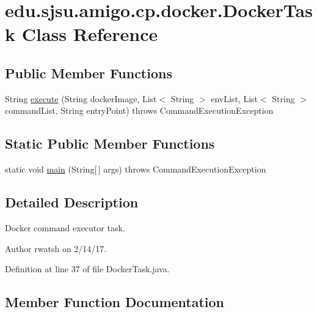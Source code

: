 \hypertarget{classedu_1_1sjsu_1_1amigo_1_1cp_1_1docker_1_1_docker_task}{}\section{edu.\+sjsu.\+amigo.\+cp.\+docker.\+Docker\+Task Class Reference}
\label{classedu_1_1sjsu_1_1amigo_1_1cp_1_1docker_1_1_docker_task}
\subsection*{Public Member Functions}
\begin{DoxyCompactItemize}
\item 
String \hyperlink{classedu_1_1sjsu_1_1amigo_1_1cp_1_1docker_1_1_docker_task_a84267c819516a7d659f5c3c64a0b9e6e}{execute} (String docker\+Image, List$<$ String $>$ env\+List, List$<$ String $>$ command\+List, String entry\+Point)  throws Command\+Execution\+Exception 
\end{DoxyCompactItemize}
\subsection*{Static Public Member Functions}
\begin{DoxyCompactItemize}
\item 
static void \hyperlink{classedu_1_1sjsu_1_1amigo_1_1cp_1_1docker_1_1_docker_task_a21be6689ed6fbf01bc05c15fadf7bdd5}{main} (String\mbox{[}$\,$\mbox{]} args)  throws Command\+Execution\+Exception 
\end{DoxyCompactItemize}


\subsection{Detailed Description}
Docker command executor task.

\begin{DoxyAuthor}{Author}
rwatsh on 2/14/17. 
\end{DoxyAuthor}


Definition at line 37 of file Docker\+Task.\+java.



\subsection{Member Function Documentation}
\mbox{\label{classedu_1_1sjsu_1_1amigo_1_1cp_1_1docker_1_1_docker_task_a84267c819516a7d659f5c3c64a0b9e6e}} 
